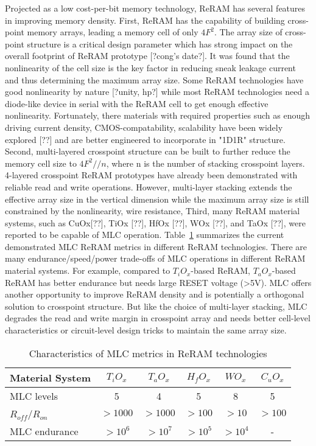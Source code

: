 Projected as a low cost-per-bit memory technology, ReRAM has several features in improving memory density. First, ReRAM has the capability of building cross-point memory arrays, leading a memory cell of only $4F^2$. The array size of cross-point structure is a critical design parameter which has strong impact on the overall footprint of ReRAM prototype [?cong's date?]. It was found that the nonlinearity of the cell size is the key factor in reducing sneak leakage current and thus determining the maximum array size. Some ReRAM technologies have good nonlinearity by nature [?unity, hp?] while most ReRAM technologies need a diode-like device in serial with the ReRAM cell to get enough effective nonlinearity. Fortunately, there materials with required properties such as enough driving current density, CMOS-compatability, scalability have been widely explored [??] and are better engineered to incorporate in "1D1R" structure. Second, multi-layered crosspoint structure can be built to further reduce the memory cell size to $4F^2//n$, where n is the number of stacking crosspoint layers. 4-layered crosspoint ReRAM prototypes have already been demonstrated with reliable read and write operations. However, multi-layer stacking extends the effective array size in the vertical dimension while the maximum array size is still constrained by the nonlinearity, wire resistance, Third, many ReRAM material systems,
such as CuOx[??], TiOx [??], HfOx [??], WOx [??], and TaOx [??], were reported to be capable of MLC operation. Table~\ref{tb:mlc} summarizes the current demonstrated MLC ReRAM metrics in different ReRAM technologies. There are many endurance/speed/power trade-offs of MLC operations in different ReRAM material systems. For example, compared to $T_iO_x$-based ReRAM, $T_aO_x$-based ReRAM has better endurance but needs large RESET voltage (>5V). MLC offers another opportunity to improve ReRAM density and is potentially a orthogonal solution to crosspoint structure. But like the choice of multi-layer stacking, MLC degrades the read and write margin in crosspoint array and needs better cell-level characteristics or circuit-level design tricks to maintain the same array size.

\begin{table}[t]
\centering
\caption{Characteristics of MLC metrics in ReRAM technologies}
\vspace{-5pt}
\label{tb:mlc}
\begin{tabular}{ l | c | c | c | c | c}
\hline\hline
Material System & $T_iO_x$ & $T_aO_x$ & $H_fO_x$ & $WO_x$ & $C_uO_x$\\
\hline
MLC levels & 5 & 4 & 5 & 8 & 5\\
\hline
$R_{off}$/$R_{on}$& $>1000$ & $>1000$ & $>100$ & $>10$ & $>100$\\
\hline
MLC endurance  & $>10^6$ & $>10^7$ & $>10^5$ & $>10^4$ & -\\
\hline\hline
\end{tabular}
\vspace{-10pt}
\end{table}

